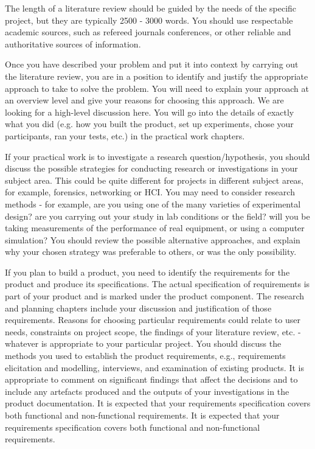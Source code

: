 {    The length of a literature review should be guided by the needs of the specific project, but they are typically 2500 - 3000 words. You should use respectable academic sources,
    such as refereed journals conferences, or other reliable and authoritative sources of information.

    Once you have described your problem and put it into context by carrying out the literature review, you are in a position to identify and justify the appropriate approach
    to take to solve the problem. You will need to explain your approach at an overview level and give your reasons for choosing this approach. We are looking for a
    high-level discussion here. You will go into the details of exactly what you did (e.g. how you built the product, set up experiments, chose your participants, ran your
    tests, etc.) in the practical work chapters.

    If your practical work is to investigate a research question/hypothesis, you should discuss the possible strategies for conducting research or
    investigations in your subject area. This could be quite different for projects in different subject areas, for example, forensics, networking or HCI. You may need to
    consider research methods - for example, are you using one of the many varieties of experimental design? are you carrying out your study in lab conditions or the
    field? will you be taking measurements of the performance of real equipment, or using a computer simulation? You should review the possible alternative approaches, and
    explain why your chosen strategy was preferable to others, or was the only possibility.

    If you plan to build a product, you need to identify the requirements for the product and produce its specifications. The actual specification of requirements is part
    of your product and is marked under the product component. The research and planning chapters include your discussion and justification of those requirements. Reasons
    for choosing particular requirements could relate to user needs, constraints on project scope, the findings of your literature review, etc. - whatever is appropriate
    to your particular project. You should discuss the methods you used to establish the product requirements, e.g., requirements elicitation and modelling, interviews,
    and examination of existing products. It is appropriate to comment on significant findings that affect the decisions and to include any artefacts produced and the outputs
    of your investigations in the product documentation. It is expected that your requirements specification covers both functional and non-functional requirements. It is
    expected that your requirements specification covers both functional and non-functional requirements.

}
